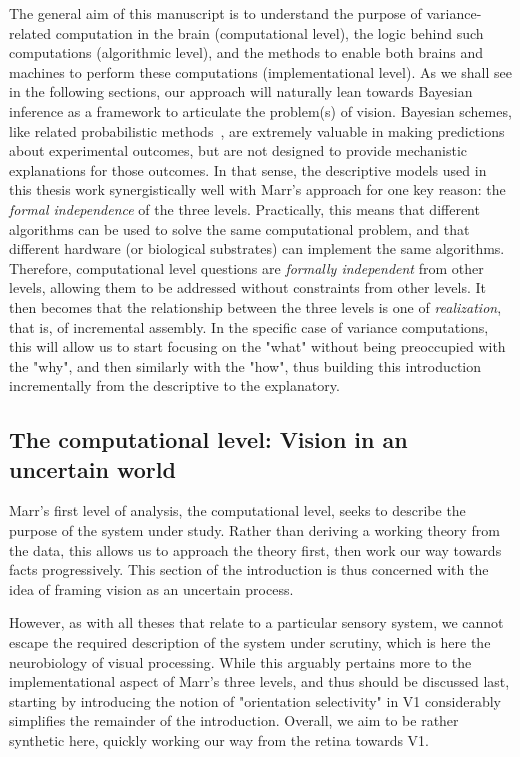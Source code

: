 The general aim of this manuscript is to understand the purpose of variance-related computation in the brain (computational level), the logic behind such computations (algorithmic level), and the methods to enable both brains and machines to perform these computations (implementational level). 
As we shall see in the following sections, our approach will naturally lean towards Bayesian inference as a framework to articulate the problem(s) of vision. Bayesian schemes, like related probabilistic methods~\cite{aitchison2017or}, are extremely valuable in making predictions about experimental outcomes, but are not designed to provide mechanistic explanations for those outcomes. In that sense, the descriptive models used in this thesis work synergistically well with Marr's approach \cite{colombo2012bayes} for one key reason: the \textit{formal independence} of the three levels. Practically, this means that different algorithms can be used to solve the same computational problem, and that different hardware (or biological substrates) can implement the same algorithms. Therefore, computational level questions are \textit{formally independent} from other levels, allowing them to be addressed without constraints from other levels. 
It then becomes that the relationship between the three levels is one of \textit{realization}, that is, of incremental assembly. In the specific case of variance computations, this will allow us to start focusing on the "what" without being preoccupied with the "why", and then similarly with the "how", thus building this introduction incrementally from the descriptive to the explanatory.



\newpage



\subsection{The computational level: Vision in an uncertain world}
Marr's first level of analysis, the computational level, seeks to describe the purpose of the system under study. Rather than deriving a working theory from the data, this allows us to approach the theory first, then work our way towards facts progressively. This section of the introduction is thus concerned with the idea of framing vision as an uncertain process.

However, as with all theses that relate to a particular sensory system, we cannot escape the required description of the system under scrutiny, which is here the neurobiology of visual processing. While this arguably pertains more to the implementational aspect of Marr's three levels, and thus should be discussed last, starting by introducing the notion of "orientation selectivity" in \gls{V1} considerably simplifies the remainder of the introduction. Overall, we aim to be rather synthetic here, quickly working our way from the retina towards \gls{V1}. 

